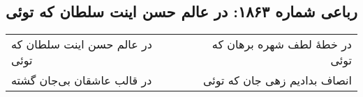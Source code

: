 \begin{center}
\section*{رباعی شماره ۱۸۶۳: در عالم حسن اینت سلطان که توئی}
\label{sec:1863}
\begin{longtable}{l p{0.5cm} r}
در عالم حسن اینت سلطان که توئی
&&
در خطهٔ لطف شهره برهان که توئی
\\
در قالب عاشقان بی‌جان گشته
&&
انصاف بدادیم زهی جان که توئی
\\
\end{longtable}
\end{center}
